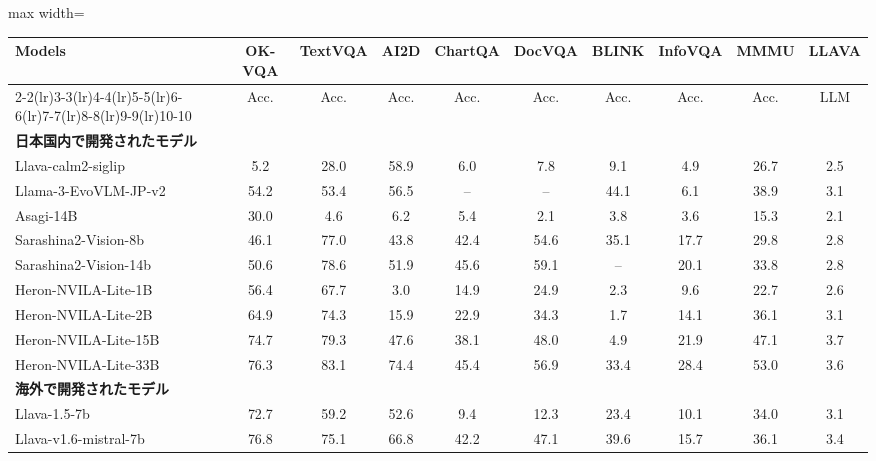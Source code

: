 \begingroup
\setlength{\tabcolsep}{2pt}
\renewcommand{\arraystretch}{0.9}
\begin{table*}[t]
\centering
\footnotesize
\caption{競争力のある視覚言語モデルの\methodName を用いた\textbf{英語タスク}での評価例．
``--''は評価データセットを学習に用いているためスコアが算出できないことを示す．\textbf{太字}は最も高い結果．\underline{下線}は二番目に高い結果を示している．}
\vspace{.2em}
\begin{adjustbox}{max width=\linewidth}
\begin{tabular}{lccccccccc}
\toprule
\multirow{2}{*}{\textbf{Models}} & \textbf{OK-VQA} & \textbf{TextVQA} & \textbf{AI2D} & \textbf{ChartQA} & \textbf{DocVQA} & \textbf{BLINK} & \textbf{InfoVQA} & \textbf{MMMU} & \textbf{LLAVA}\\
\cmidrule(lr){2-2}\cmidrule(lr){3-3}\cmidrule(lr){4-4}\cmidrule(lr){5-5}\cmidrule(lr){6-6}\cmidrule(lr){7-7}\cmidrule(lr){8-8}\cmidrule(lr){9-9}\cmidrule(lr){10-10}
 & Acc. & Acc. & Acc. & Acc. & Acc. & Acc. & Acc. & Acc. & LLM \\
\midrule
\multicolumn{10}{l}{\textbf{日本国内で開発されたモデル}} \\
\midrule
Llava-calm2-siglip & 5.2 & 28.0 & 58.9 & 6.0 & 7.8 & 9.1 & 4.9 & 26.7 & 2.5 \\
Llama-3-EvoVLM-JP-v2 & 54.2 & 53.4 & 56.5 & -- & -- & 44.1 & 6.1 & 38.9 & 3.1 \\
Asagi-14B & 30.0 & 4.6 & 6.2 & 5.4 & 2.1 & 3.8 & 3.6 & 15.3 & 2.1 \\
Sarashina2-Vision-8b & 46.1 & 77.0 & 43.8 & 42.4 & 54.6 & 35.1 & 17.7 & 29.8 & 2.8 \\
Sarashina2-Vision-14b & 50.6 & 78.6 & 51.9 & 45.6 & 59.1 & -- & 20.1 & 33.8 & 2.8 \\
Heron-NVILA-Lite-1B & 56.4 & 67.7 & 3.0 & 14.9 & 24.9 & 2.3 & 9.6 & 22.7 & 2.6 \\
Heron-NVILA-Lite-2B & 64.9 & 74.3 & 15.9 & 22.9 & 34.3 & 1.7 & 14.1 & 36.1 & 3.1 \\
Heron-NVILA-Lite-15B & 74.7 & 79.3 & 47.6 & 38.1 & 48.0 & 4.9 & 21.9 & 47.1 & 3.7 \\
Heron-NVILA-Lite-33B & 76.3 & 83.1 & 74.4 & 45.4 & 56.9 & 33.4 & 28.4 & 53.0 & 3.6 \\
\midrule
\multicolumn{10}{l}{\textbf{海外で開発されたモデル}} \\
\midrule
Llava-1.5-7b & 72.7 & 59.2 & 52.6 & 9.4 & 12.3 & 23.4 & 10.1 & 34.0 & 3.1 \\
Llava-v1.6-mistral-7b & 76.8 & 75.1 & 66.8 & 42.2 & 47.1 & 39.6 & 15.7 & 36.1 & 3.4 \\

\end{tabular}
\end{adjustbox}
\end{table*}
